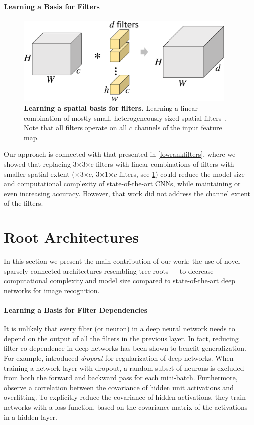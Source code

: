 \documentclass[thesis]{subfiles}
\begin{document}
	\paragraph{Learning a Basis for Filters}
	\begin{figure}[tbp]
		\centering
		\includegraphics[width=0.95\textwidth, page=3]{Figs/PDF/sparsification}
		\caption[Learning a spatial basis for filters.]{\textbf{Learning a spatial basis for filters.} Learning a linear combination of mostly small, heterogeneously sized spatial filters~\citep{Ioannou2016}. Note that all filters operate on all $c$ channels of the input feature map.}
		\label{fig:spatialbasis}
	\end{figure}
	Our approach is connected with that presented in \cref{lowrankfilters}, where we showed that replacing 3$\times$3$\times$c filters with linear combinations of filters with smaller spatial extent ($\times$3$\times c$, 3$\times$1$\times c$ filters, see \cref{fig:spatialbasis}) could reduce the model size and computational complexity of state-of-the-art CNNs, while maintaining or even increasing accuracy. However, that work did not address the channel extent of the filters.
	\section{Root Architectures}
	\label{method}
	In this section we present the main contribution of our work: the use of novel sparsely connected architectures resembling tree roots --- to decrease computational complexity and model size compared to state-of-the-art deep networks for image recognition.
	
	\paragraph{Learning a Basis for Filter Dependencies}
	It is unlikely that every filter (or neuron) in a deep neural network needs to depend on the output of all the filters in the previous layer. In fact, reducing filter co-dependence in deep networks has been shown to benefit generalization. For example, \citet{Hinton2012} introduced {\em dropout} for regularization of deep networks. When training a network layer with dropout, a random subset of neurons is excluded from both the forward and backward pass for each mini-batch.  Furthermore, \citet{Cogswell2016} observe a correlation between the covariance of hidden unit activations and overfitting. To explicitly reduce the covariance of hidden activations, they train networks with a loss function, based on the covariance matrix of the activations in a hidden layer. 
	
\end{document}
